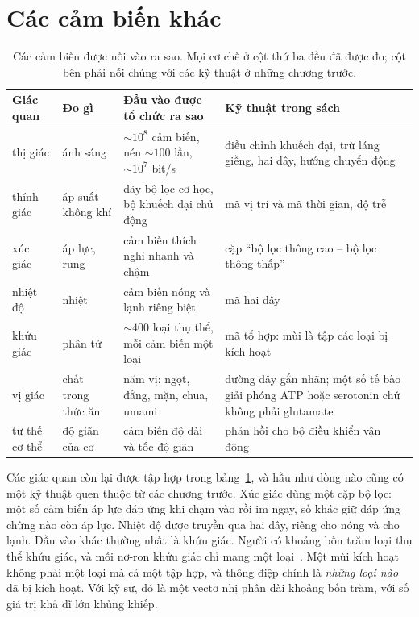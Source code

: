 \section{Các cảm biến khác}

\begin{table}[t]
\centering
\footnotesize
\setlength{\tabcolsep}{3pt}
\renewcommand{\arraystretch}{1.15}
\begin{tabular}{>{\raggedright}p{1.9cm}>{\raggedright}p{2.6cm}>{\raggedright}p{4.0cm}>{\raggedright\arraybackslash}p{4.6cm}}
\toprule
Giác quan & Đo gì & Đầu vào được tổ chức ra sao & Kỹ thuật trong sách \\
\midrule
thị giác & ánh sáng & $\sim10^8$ cảm biến, nén $\sim100$ lần, $\sim10^7$ bit/s & điều chỉnh khuếch đại, trừ láng giềng, hai dây, hướng chuyển động \\
thính giác & áp suất không khí & dãy bộ lọc cơ học, bộ khuếch đại chủ động & mã vị trí và mã thời gian, độ trễ \\
xúc giác & áp lực, rung & cảm biến thích nghi nhanh và chậm & cặp ``bộ lọc thông cao -- bộ lọc thông thấp'' \\
nhiệt độ & nhiệt & cảm biến nóng và lạnh riêng biệt & mã hai dây \\
khứu giác & phân tử & $\sim400$ loại thụ thể, mỗi cảm biến một loại & mã tổ hợp: mùi là tập các loại bị kích hoạt \\
vị giác & chất trong thức ăn & năm vị: ngọt, đắng, mặn, chua, umami & đường dây gắn nhãn; một số tế bào giải phóng ATP hoặc serotonin chứ không phải glutamate \\
tư thế cơ thể & độ giãn của cơ & cảm biến độ dài và tốc độ giãn & phản hồi cho bộ điều khiển vận động \\
\bottomrule
\end{tabular}
\caption{Các cảm biến được nối vào ra sao. Mọi cơ chế ở cột thứ ba đều đã được đo; cột bên phải nối chúng với các kỹ thuật ở những chương trước.}
\label{tab:sensors}
\end{table}

Các giác quan còn lại được tập hợp trong bảng~\ref{tab:sensors}, và hầu như dòng nào cũng có một kỹ thuật quen thuộc từ các chương trước. Xúc giác dùng một cặp bộ lọc: một số cảm biến áp lực đáp ứng khi chạm vào rồi im ngay, số khác giữ đáp ứng chừng nào còn áp lực. Nhiệt độ được truyền qua hai dây, riêng cho nóng và cho lạnh. Đầu vào khác thường nhất là khứu giác. Người có khoảng bốn trăm loại thụ thể khứu giác, và mỗi nơ-ron khứu giác chỉ mang một loại~\cite{Mombaerts2004}. Một mùi kích hoạt không phải một loại mà cả một tập hợp, và thông điệp chính là \emph{những loại nào} đã bị kích hoạt. Với kỹ sư, đó là một vectơ nhị phân dài khoảng bốn trăm, với số giá trị khả dĩ lớn khủng khiếp.


